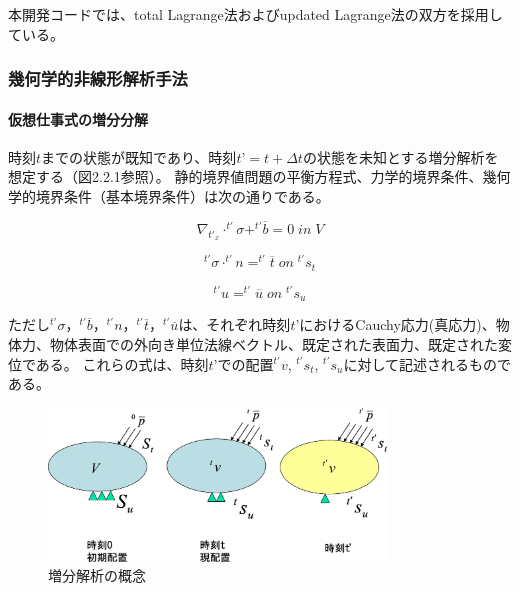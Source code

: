 \documentclass[a4paper,pandoc,ja=standard]{bxjsarticle}
\let\oldparagraph\paragraph
\renewcommand{\paragraph}[1]{\oldparagraph{#1}\mbox{}}
\begin{document}
本開発コードでは、total Lagrange法およびupdated Lagrange法の双方を採用している。

\hypertarget{ux5e7eux4f55ux5b66ux7684ux975eux7ddaux5f62ux89e3ux6790ux624bux6cd5}{%
\subsubsection{幾何学的非線形解析手法}\label{ux5e7eux4f55ux5b66ux7684ux975eux7ddaux5f62ux89e3ux6790ux624bux6cd5}}

\hypertarget{ux4eeeux60f3ux4ed5ux4e8bux5f0fux306eux5897ux5206ux5206ux89e3}{%
\paragraph{仮想仕事式の増分分解}\label{ux4eeeux60f3ux4ed5ux4e8bux5f0fux306eux5897ux5206ux5206ux89e3}}

時刻\(t\)までの状態が既知であり、時刻\(t’=t + \Delta t\)の状態を未知とする増分解析を想定する（図2.2.1参照）。
静的境界値問題の平衡方程式、力学的境界条件、幾何学的境界条件（基本境界条件）は次の通りである。

\begin{equation}
\nabla_{t'_x} \cdot ^{t'} \sigma +^{t'} \overline{b} =0 \; in \; V
\label{eq:2.2.1}
\end{equation}

\begin{equation}
^{t'} \sigma \cdot^{t'} n = ^{t'} \overline{t} \; on \; ^{t'}s_t
\label{eq:2.2.2}
\end{equation}

\begin{equation}
^{t'} u = ^{t'} \overline{u} \; on \; ^{t'} s_u
\label{eq:2.2.3}
\end{equation}

ただし\(^{t'} \sigma\)，\(^{t'} \overline{b}\)，\(^{t'} n\)，\(^{t'} \overline{t}\)，\(^{t'} \overline{u}\)は、それぞれ時刻\(t’\)におけるCauchy応力(真応力)、物体力、物体表面での外向き単位法線ベクトル、既定された表面力、既定された変位である。
これらの式は、時刻\(t’\)での配置\(^{t'}v\), \(^{t'}s_t\), \(^{t'}s_u\)に対して記述されるものである。

\begin{figure}
\centering
\includegraphics[width=0.8\textwidth,height=\textheight]{media/theory02_01.png}
\caption{増分解析の概念}
\end{figure}
\end{document}

